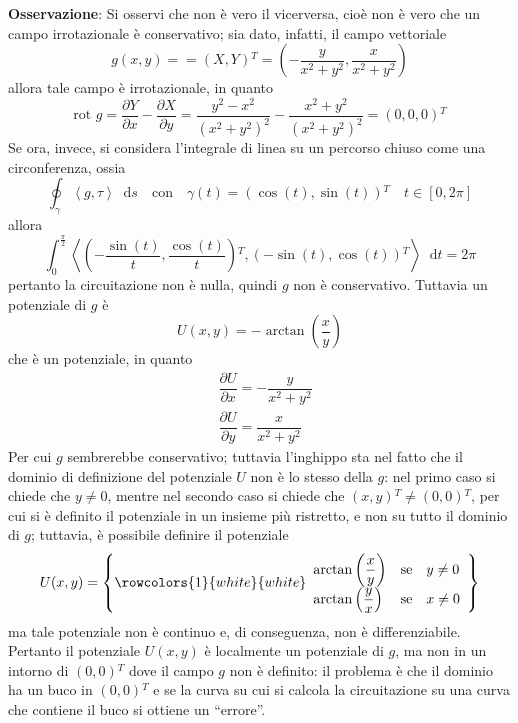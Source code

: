 \documentclass[a4paper]{extarticle}
\newcommand{\quotes}[1]{``#1''}
\newcommand*\dif{\mathop{}\!\mathrm{d}}
\begin{document}
\vspace{2em}
\noindent
\textbf{Osservazione}: Si osservi che non è vero il vicerversa, cioè non è vero che un campo irrotazionale è conservativo; sia dato, infatti, il campo vettoriale
\[g(x,y) = = \left(X,Y\right){^T} = \left(-\frac{y}{x^2+y^2}, \frac{x}{x^2+y^2}\right)\]
allora tale campo è irrotazionale, in quanto
\[\text{rot } g = \dfrac{\partial Y}{\partial x} - \dfrac{\partial X}{\partial y} = \dfrac{y^2-x^2}{(x^2+y^2)^2} - \frac{x^2+y^2}{(x^2+y^2)^2}=(0,0,0){^T}\]
Se ora, invece, si considera l'integrale di linea su un percorso chiuso come una circonferenza, ossia
\[\oint_\gamma \left<g,\tau\right> \dif s \hspace{1em} \text{con} \hspace{1em} \gamma(t)=\left(\cos(t),\sin(t)\right){^T} \hspace{1em} t \in [0,2\pi]\]
allora
\[\int_0^{\frac{\pi}{2}} \left<\left(-\dfrac{\sin(t)}{t}, \dfrac{\cos(t)}{t}\right){^T}, \left(-\sin(t),\cos(t)\right){^T}\right>\dif t = 2\pi\]
pertanto la circuitazione non è nulla, quindi $g$ non è conservativo. Tuttavia un potenziale di $g$ è
\[U(x,y) = - \arctan \left(\dfrac{x}{y}\right)\]
che è un potenziale, in quanto
\begin{align*}
    &\dfrac{\partial U}{\partial x} = - \dfrac{y}{x^2+y^2}\\
    &\dfrac{\partial U}{\partial y} = \dfrac{x}{x^2+y^2}
\end{align*}
Per cui $g$ sembrerebbe conservativo; tuttavia l'inghippo sta nel fatto che il dominio di definizione del potenziale $U$ non è lo stesso della $g$: nel primo caso si chiede che $y \neq 0$, mentre nel secondo caso si chiede che $(x,y){^T} \neq (0,0){^T}$, per cui si è definito il potenziale in un insieme più ristretto, e non su tutto il dominio di $g$; tuttavia, è possibile definire il potenziale
\[U(x,y) = \left\{
    \rowcolors{1}{white}{white}
    \begin{array}{lll}
        \arctan \left(\dfrac{x}{y}\right) & \text{se} & y \neq 0\\
        \arctan \left(\dfrac{y}{x}\right) & \text{se} & x \neq 0\\
    \end{array}
\right\}\]
ma tale potenziale non è continuo e, di conseguenza, non è differenziabile. Pertanto il potenziale $U(x,y)$ è localmente un potenziale di $g$, ma non in un intorno di $(0,0){^T}$ dove il campo $g$ non è definito: il problema è che il dominio ha un buco in $(0,0){^T}$ e se la curva su cui si calcola la circuitazione su una curva che contiene il buco si ottiene un \quotes{errore}.
\end{document}
